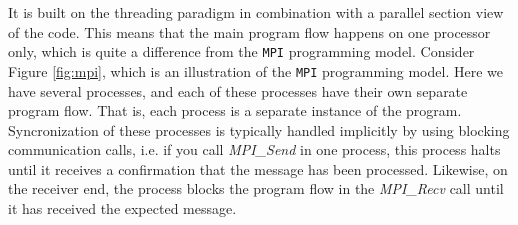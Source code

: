 \documentclass[twoside, 11pt, a4paper]{article}
\begin{document}
It is built on the threading paradigm in combination with a parallel section view
of the code. This means that the main program flow happens on one processor only,
which is quite a difference from the \texttt{MPI} programming model. Consider Figure \ref{fig:mpi},
which is an illustration of the \texttt{MPI} programming model. Here we have several
processes, and each of these processes have their own separate program flow. That is, each
process is a separate instance of the program. Syncronization of these processes
is typically handled implicitly by using blocking communication calls, i.e.
if you call \emph{MPI\_Send} in one process, this process halts until
it receives a confirmation that the message has been processed. Likewise, on the receiver
end, the process blocks the program flow in the \emph{MPI\_Recv} call until it
has received the expected message.
\end{document}
